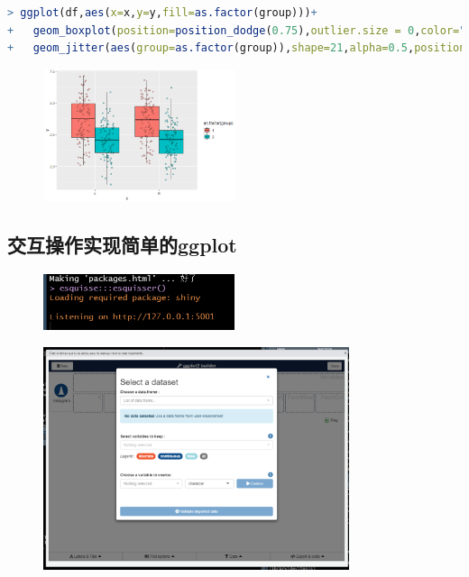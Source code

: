 \documentclass[11pt,a4paper,oneside]{book}
\begin{document}
\begin{lstlisting}[language=r]
> ggplot(df,aes(x=x,y=y,fill=as.factor(group)))+
+   geom_boxplot(position=position_dodge(0.75),outlier.size = 0,color="black")+
+   geom_jitter(aes(group=as.factor(group)),shape=21,alpha=0.5,position = position_jitterdodge(dodge.width = 0.75))
\end{lstlisting}
\begin{figure}[H]
	\centering
	\includegraphics[width=0.5\textwidth]{screenshot041}
\end{figure}
\subsection{交互操作实现简单的ggplot}
\begin{figure}[H]
	\centering
	\includegraphics[width=0.5\textwidth]{screenshot042}
\end{figure}
\begin{figure}[H]
	\centering
	\includegraphics[width=0.8\textwidth]{screenshot043}
\end{figure}
\end{document}
